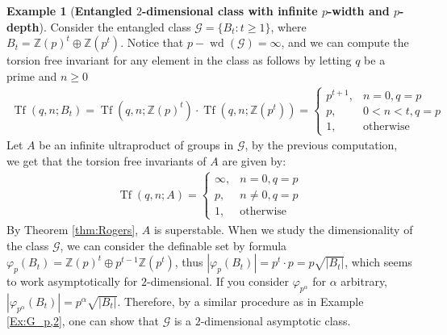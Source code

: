 \documentclass[10pt,a4paper]{amsart}
\theoremstyle{definition}
\newtheorem{ejem}[prop]{Example}
\newcommand{\bej}{\begin{ejem}}
\newcommand{\eej}{\end{ejem}}
\newcommand{\Z}{\mathbb{Z}}
\begin{document}
\bej [\textbf{Entangled $2$-dimensional class with infinite $p$-width and $p$-depth}]\label{Example:wd-infty-superstable} Consider the entangled class $\mathcal{G}=\{B_t:t\geq 1\}$, where $B_t=\mathbb{Z}(p)^t\oplus \mathbb{Z}(p^t)$. Notice that $p-\operatorname{wd}(\mathcal{G})=\infty$, and we can compute the torsion free invariant for any element in the class as follows by letting $q$ be a prime and $n\geq0$
\begin{align*}
    \operatorname{Tf}(q,n;B_t)=\operatorname{Tf}(q,n;\Z(p)^t)\cdot\operatorname{Tf}(q,n;\Z(p^t))=\begin{cases}
        p^{t+1},&n=0,q=p\\
        p,&0<n<t,q=p\\
        1,&\text{otherwise}
    \end{cases}
\end{align*}
Let $A$ be an infinite ultraproduct of groups in $\mathcal{G}$, by the previous computation, we get that the torsion free invariants of $A$ are given by:
\begin{align*}
    \operatorname{Tf}(q,n;A)=\begin{cases}
        \infty,&n=0,q=p\\
        p,&n\neq0,q=p\\
        1,&\text{otherwise}
    \end{cases}
\end{align*}
By Theorem \ref{thm:Rogers}, $A$ is superstable. When we study the dimensionality of the class $\mathcal{G}$, we can consider the definable set by formula $\varphi_p(B_t) = \Z(p)^t\oplus p^{t-1}\Z(p^t)$, thus $|\varphi_p(B_t)|=p^t\cdot p=p\sqrt{|B_t|}$, which seems to work asymptotically for $2$-dimensional. If you consider $\varphi_{p^\alpha}$ for $\alpha$ arbitrary, $|\varphi_{p^{\alpha}}(B_t)|=p^\alpha\sqrt{|B_t|}$. Therefore, by a similar procedure as in Example \ref{Ex:G_p,2}, one can show that $\mathcal{G}$ is a $2$-dimensional asymptotic class.
\eej
\end{document}
